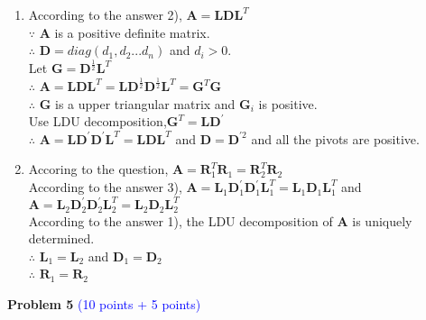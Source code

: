 \documentclass[english,onecolumn]{IEEEtran}
\begin{document}
\begin{enumerate}
    	
    \item
    	According to the answer 2), $\mathbf{A}=\mathbf{L}\mathbf{D}\mathbf{L}^{T}$\\
    	$\because$ $\mathbf{A}$ is a positive definite matrix.\\
    	$\therefore$ $\mathbf{D}=diag(d_{1},d_{2}...d_{n})$ and $d_{i}>0$.\\
    	Let $\mathbf{G}=\mathbf{D}^{\frac{1}{2}}\mathbf{L}^{T}$\\
    	$\therefore$ $\mathbf{A}=\mathbf{L}\mathbf{D}\mathbf{L}^{T}=\mathbf{L}\mathbf{D}^{\frac{1}{2}}\mathbf{D}^{\frac{1}{2}}\mathbf{L}^{T}=\mathbf{G}^{T}\mathbf{G}$\\
    	$\therefore$ $\mathbf{G}$ is a upper triangular matrix and $\mathbf{G}_i$ is positive.\\
	Use LDU decomposition,$\mathbf{G}^{T}=\mathbf{L}\mathbf{D}^{'}$\\
	$\therefore$ $\mathbf{A}=\mathbf{L}\mathbf{D}^{'}\mathbf{D}^{'}\mathbf{L}^{T}=\mathbf{L}\mathbf{D}\mathbf{L}^{T}$  and $\mathbf{D}=\mathbf{D}^{'2}$ and all the pivots are positive.\\


    \item
    Accoring to the question, $\mathbf{A}=\mathbf{R}^{T}_{1}\mathbf{R}_{1}=\mathbf{R}^{T}_{2}\mathbf{R}_{2}$\\
	According to the answer 3), $\mathbf{A}=\mathbf{L}_{1}\mathbf{D}^{'}_{1}\mathbf{D}^{'}_{1}\mathbf{L}^{T}_{1}=\mathbf{L}_{1}\mathbf{D}_{1}\mathbf{L}^{T}_{1}$ and $\mathbf{A}=\mathbf{L}_{2}\mathbf{D}^{'}_{2}\mathbf{D}^{'}_{2}\mathbf{L}^{T}_{2}=\mathbf{L}_{2}\mathbf{D}_{2}\mathbf{L}^{T}_{2}$\\
	According to the answer 1), the LDU decomposition of $\mathbf{A}$ is uniquely determined.\\
	$\therefore$ $\mathbf{L}_{1}=\mathbf{L}_{2}$ and $\mathbf{D}_{1}=\mathbf{D}_{2}$\\
	$\therefore$ $\mathbf{R}_{1}=\mathbf{R}_{2}$\\


\end{enumerate}

\newpage
\noindent\textbf{Problem 5}
\textcolor{blue}{(10 points + 5 points)}
\end{document}

